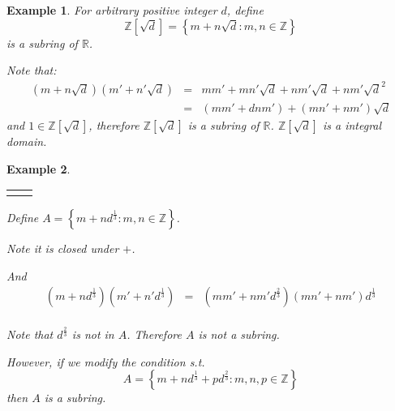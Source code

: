 \documentclass{article}
\theoremstyle{MyNonumberplain}
\theoremstyle{break}
\newcommand{\nline}{\begin{tabular}{ll}&\\\end{tabular}}
\theoremstyle{break}
\newtheorem{example}{Example}[section]
\theoremstyle{break}
\theoremstyle{definition}
\theoremstyle{break}
\begin{document}
\begin{expbox}
    \begin{example}
        For arbitrary positive integer $d$, define
        \[ \mathbb{Z} \left[ \sqrt{d} \right] = \left\{ m + n \sqrt{d} : m, n \in
           \mathbb{Z} \right\} \]
        is a subring of $\mathbb{R}$.\bigskip
        
        Note that:
        \begin{eqnarray*}
          \left( m + n \sqrt{d} \right) \left( m' + n' \sqrt{d} \right) & = & m m' + m
          n' \sqrt{d} + n m' \sqrt{d} + n m' \sqrt{d}^2\\
          & = & (m m' + d n m') + (m n' + n m') \sqrt{d}
        \end{eqnarray*}
        and $1 \in \mathbb{Z} \left[ \sqrt{d} \right]$, therefore $\mathbb{Z} \left[
        \sqrt{d} \right]$ is a subring of $\mathbb{R}$. $\mathbb{Z} \left[ \sqrt{d}
        \right]$ is a integral domain.
    \end{example}
\end{expbox}

\begin{expbox}
    \begin{example}

        \nline

        Define $A = \left\{ m + n d^{\frac{1}{3}} : m, n \in \mathbb{Z} \right\}$.\bigskip

        Note it is closed under $+$.\bigskip
        
        And
        \begin{eqnarray*}
          \left( m + n d^{\frac{1}{3}} \right) \left( m' + n' d^{\frac{1}{3}} \right)
          & = & \left( m m' + n m' d^{\frac{2}{3}} \right) (m n' + n m')
          d^{\frac{1}{3}}
        \end{eqnarray*}\\
        Note that $d^{\frac{2}{3}}$ is not in $A$. Therefore $A$ is not a subring.\bigskip

        However, if we modify the condition s.t.
        \[ A = \left\{ m + n d^{\frac{1}{3}} + p d^{\frac{2}{3}} : m, n, p \in
           \mathbb{Z} \right\} \]
        then $A$ is a subring.
    \end{example}
\end{expbox}
\end{document}
